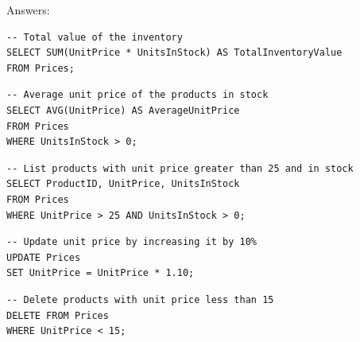 \documentclass[10pt]{article}
\begin{document}
Answers:

\begin{verbatim}
-- Total value of the inventory
SELECT SUM(UnitPrice * UnitsInStock) AS TotalInventoryValue
FROM Prices;
\end{verbatim}

\begin{verbatim}
-- Average unit price of the products in stock
SELECT AVG(UnitPrice) AS AverageUnitPrice
FROM Prices
WHERE UnitsInStock > 0;
\end{verbatim}

\begin{verbatim}
-- List products with unit price greater than 25 and in stock
SELECT ProductID, UnitPrice, UnitsInStock
FROM Prices
WHERE UnitPrice > 25 AND UnitsInStock > 0;
\end{verbatim}

\begin{verbatim}
-- Update unit price by increasing it by 10%
UPDATE Prices
SET UnitPrice = UnitPrice * 1.10;
\end{verbatim}

\begin{verbatim}
-- Delete products with unit price less than 15
DELETE FROM Prices
WHERE UnitPrice < 15;
\end{verbatim}

\printindex
\end{document}
